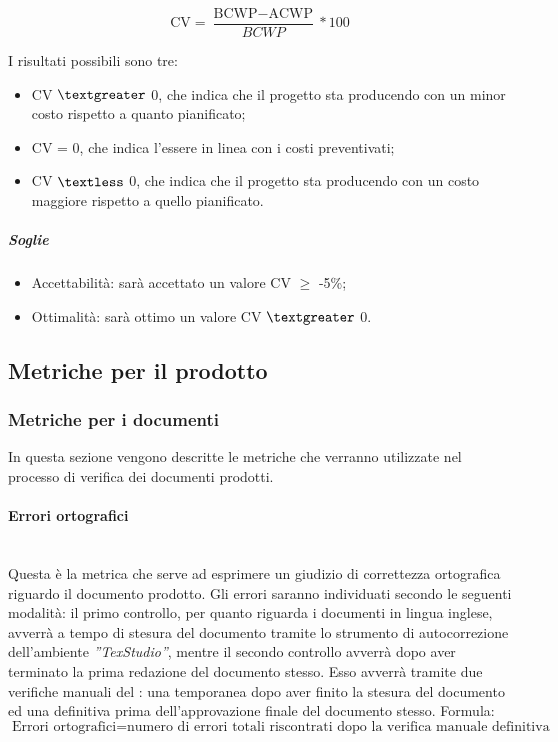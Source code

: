 	\begin{displaymath}
\mbox{CV}= \frac{\mbox{BCWP}-\mbox{ACWP}}{BCWP}*100\end{displaymath}

I risultati possibili sono tre:

\begin{itemize}
\item CV $\textgreater$ 0, che indica che il progetto sta producendo con un minor costo rispetto a quanto pianificato;
\item CV = 0, che indica l'essere in linea con i costi preventivati;
\item CV $\textless$ 0, che indica che il progetto sta producendo con un costo maggiore rispetto a quello pianificato.
\end{itemize}

\subparagraph{Soglie}
\begin{itemize}
\item Accettabilità: sarà accettato un valore CV $\ge$ -5\%;
\item Ottimalità: sarà ottimo un valore CV $\textgreater$ 0.
\end{itemize}

\subsection{Metriche per il prodotto}
\label{AppB:metricheProd}
\subsubsection{Metriche per i documenti}
\label{AppB:metricheDoc}
In questa sezione vengono descritte le metriche che verranno utilizzate nel processo di verifica dei documenti prodotti.
\paragraph{Errori ortografici}
\label{AppB:ErroriOrtografici}
	~\\Questa è la metrica che serve ad esprimere un giudizio di correttezza ortografica riguardo il documento prodotto. Gli errori saranno individuati secondo le seguenti modalità:
il primo controllo, per quanto riguarda i documenti in lingua inglese, avverrà a tempo di stesura del documento tramite lo strumento di autocorrezione dell'ambiente \emph{''TexStudio''}, mentre il secondo controllo avverrà dopo aver terminato la prima redazione del documento stesso. Esso avverrà tramite due verifiche manuali del \ver{}: una temporanea dopo aver finito la stesura del documento ed una definitiva prima dell'approvazione finale del documento stesso.
\newline Formula:
\begin{displaymath}
\mbox{Errori ortografici}= {\mbox{numero di errori totali riscontrati dopo la verifica manuale definitiva}}
\end{displaymath}

